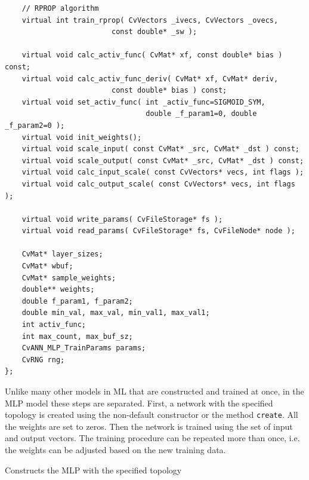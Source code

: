 \begin{lstlisting}
    // RPROP algorithm
    virtual int train_rprop( CvVectors _ivecs, CvVectors _ovecs, 
					     const double* _sw );

    virtual void calc_activ_func( CvMat* xf, const double* bias ) const;
    virtual void calc_activ_func_deriv( CvMat* xf, CvMat* deriv, 
					     const double* bias ) const;
    virtual void set_activ_func( int _activ_func=SIGMOID_SYM,
                                 double _f_param1=0, double _f_param2=0 );
    virtual void init_weights();
    virtual void scale_input( const CvMat* _src, CvMat* _dst ) const;
    virtual void scale_output( const CvMat* _src, CvMat* _dst ) const;
    virtual void calc_input_scale( const CvVectors* vecs, int flags );
    virtual void calc_output_scale( const CvVectors* vecs, int flags );

    virtual void write_params( CvFileStorage* fs );
    virtual void read_params( CvFileStorage* fs, CvFileNode* node );

    CvMat* layer_sizes;
    CvMat* wbuf;
    CvMat* sample_weights;
    double** weights;
    double f_param1, f_param2;
    double min_val, max_val, min_val1, max_val1;
    int activ_func;
    int max_count, max_buf_sz;
    CvANN_MLP_TrainParams params;
    CvRNG rng;
};
\end{lstlisting}

Unlike many other models in ML that are constructed and trained at once, in the MLP model these steps are separated. First, a network with the specified topology is created using the non-default constructor or the method \texttt{create}. All the weights are set to zeros. Then the network is trained using the set of input and output vectors. The training procedure can be repeated more than once, i.e. the weights can be adjusted based on the new training data.


Constructs the MLP with the specified topology


\begin{description}
\end{description}

